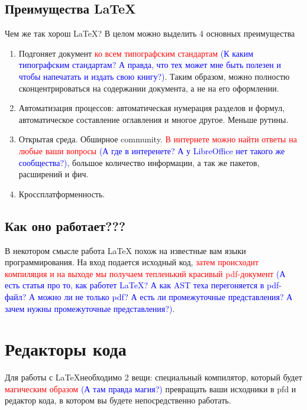     \subsection{Преимущества \LaTeX}

    Чем же так хорош \LaTeX? В целом можно выделить 4 основных преимущества

    \begin{enumerate}
        \item Подгоняет документ \textcolor{Red}{ко всем типографским стандартам} \textcolor{Blue}{(К каким типографским стандартам? А правда, что тех может мне быть полезен и чтобы напечатать и издать свою книгу?)}. Таким образом, можно полностю сконцентрироваться на содержании документа, а не на его оформлении.
        \item Автоматизация процессов: автоматическая нумерация разделов и формул, автоматическое составление оглавления и многое другое. Меньше рутины.
        \item Открытая среда. Обширное community. \textcolor{Red}{В интернете можно найти ответы на любые ваши вопросы} \textcolor{Blue}{(А где в интеренете? А у LibreOffice нет такого же сообщества?)}, большое количество информации, а так же пакетов, расширений и фич.
        \item Кроссплатформенность.
    \end{enumerate}

    \subsection{Как оно работает???}

    В некотором смысле работа LaTeX похож на известные вам языки программирования. На вход подается исходный код, \textcolor{Red}{затем происходит компиляция и на выходе мы получаем тепленький красивый pdf-документ} \textcolor{Blue}{(А есть статья про то, как работет LaTeX? А как AST теха перегоняется в pdf-файл? А можно ли не только pdf? А есть ли промежуточные представления? А зачем нужны промежуточные представления?)}.


    \section{Редакторы кода}

    Для работы с \LaTeX необходимо 2 вещи: специальный компилятор, который будет \textcolor{Red}{магическим образом} \textcolor{Blue}{(А там правда магия?)} превращать ваши исходники в pfd и редактор кода, в котором вы будете непосредственно работать.
    

